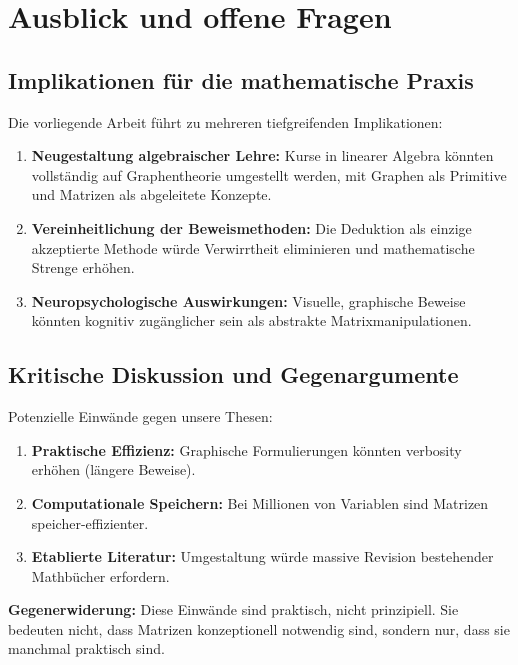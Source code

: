 \documentclass[12pt, a4paper]{article}
\theoremstyle{definition}
\theoremstyle{remark}
\begin{document}
\section{Ausblick und offene Fragen}
\label{sec:ausblick}

\subsection{Implikationen für die mathematische Praxis}
\label{subsec:implikationen}

Die vorliegende Arbeit führt zu mehreren tiefgreifenden Implikationen:

\begin{enumerate}[label=(\roman*)]
  \item \textbf{Neugestaltung algebraischer Lehre:} Kurse in linearer Algebra könnten vollständig auf Graphentheorie umgestellt werden, mit Graphen als Primitive und Matrizen als abgeleitete Konzepte.
  \item \textbf{Vereinheitlichung der Beweismethoden:} Die Deduktion als einzige akzeptierte Methode würde Verwirrtheit eliminieren und mathematische Strenge erhöhen.
  \item \textbf{Neuropsychologische Auswirkungen:} Visuelle, graphische Beweise könnten kognitiv zugänglicher sein als abstrakte Matrixmanipulationen.
\end{enumerate}

\subsection{Kritische Diskussion und Gegenargumente}
\label{subsec:kritik}

Potenzielle Einwände gegen unsere Thesen:

\begin{enumerate}[label=(\alph*)]
  \item \textbf{Praktische Effizienz:} Graphische Formulierungen könnten verbosity erhöhen (längere Beweise).
  \item \textbf{Computationale Speichern:} Bei Millionen von Variablen sind Matrizen speicher-effizienter.
  \item \textbf{Etablierte Literatur:} Umgestaltung würde massive Revision bestehender Mathbücher erfordern.
\end{enumerate}

\textbf{Gegenerwiderung:} Diese Einwände sind praktisch, nicht prinzipiell. Sie bedeuten nicht, dass Matrizen konzeptionell notwendig sind, sondern nur, dass sie manchmal praktisch sind.
\end{document}
